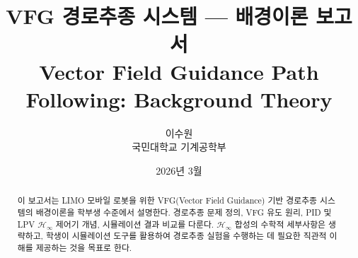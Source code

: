 \documentclass[11pt,a4paper]{article}
\title{VFG 경로추종 시스템 --- 배경이론 보고서\\
\large Vector Field Guidance Path Following: Background Theory}
\author{이수원 \\ 국민대학교 기계공학부}
\date{2026년 3월}
\begin{document}
\maketitle

\begin{abstract}
이 보고서는 LIMO 모바일 로봇을 위한 VFG(Vector Field Guidance) 기반 경로추종 시스템의 배경이론을 학부생 수준에서 설명한다.
경로추종 문제 정의, VFG 유도 원리, PID 및 LPV $\mathcal{H}_\infty$ 제어기 개념, 시뮬레이션 결과 비교를 다룬다.
$\mathcal{H}_\infty$ 합성의 수학적 세부사항은 생략하고, 학생이 시뮬레이션 도구를 활용하여 경로추종 실험을 수행하는 데 필요한 직관적 이해를 제공하는 것을 목표로 한다.
\end{abstract}

\tableofcontents
\newpage





\end{document}
